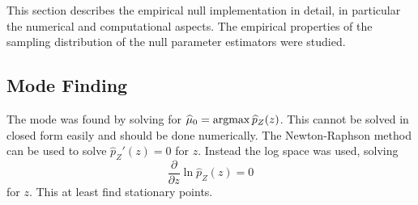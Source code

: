 This section describes the empirical null implementation in detail, in particular the numerical and computational aspects. The empirical properties of the sampling distribution of the null parameter estimators were studied.

\subsection{Mode Finding}

The mode was found by solving for $\widehat{\mu}_0 = \operatorname*{argmax}\widehat{p}_Z(z)$. This cannot be solved in closed form easily and should be done numerically. The  Newton-Raphson method can be used to solve $\hat{p}_Z'(z) = 0$ for $z$. Instead the log space was used, solving
\begin{equation}
  \dfrac{
    \partial
  }
  {
    \partial z
  }
  \ln\widehat{p}_Z(z)
  = 0
\end{equation}
for $z$. This at least find stationary points.

